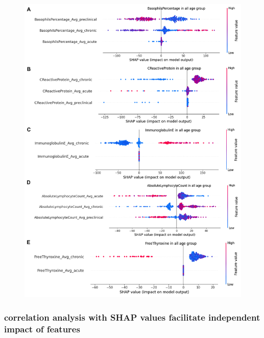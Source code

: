 \documentclass[final,1p,times,authoryear]{elsarticle}
\begin{document}
\begin{figure}[t] 
    \centering
    \includegraphics[width=\textwidth]{figures/modelexplanation.png} 
    \caption{}\label{modelexplanation}
\end{figure}


\subsubsection{correlation analysis with SHAP values facilitate independent impact of features}
\end{document}
